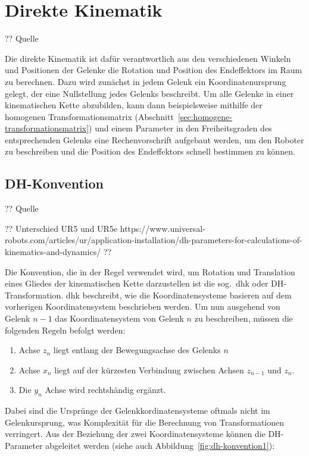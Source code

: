 \cleardoublepage


\chapter{Direkte Kinematik}\label{ch:direkte-kinematik}

?? Quelle

Die direkte Kinematik ist dafür verantwortlich aus den verschiedenen Winkeln und Positionen der Gelenke die Rotation und Position des Endeffektors im Raum zu berechnen.
Dazu wird zunächst in jedem Gelenk ein Koordinatenursprung gelegt, der eine Nullstellung jedes Gelenks beschreibt.
Um alle Gelenke in einer kinematischen Kette abzubilden, kann dann beispielsweise mithilfe der homogenen Transformationsmatrix (Abschnitt~\ref{sec:homogene-transformationsmatrix}) und einem Parameter in den Freiheitsgraden des entsprechenden Gelenks eine Rechenvorschrift aufgebaut werden, um den Roboter zu beschreiben und die Position des Endeffektors schnell bestimmen zu können.


\section{DH-Konvention}\label{sec:dh-konvention}

?? Quelle

?? Unterschied UR5 und UR5e https://www.universal-robots.com/articles/ur/application-installation/dh-parameters-for-calculations-of-kinematics-and-dynamics/ ??

Die Konvention, die in der Regel verwendet wird, um Rotation und Translation eines Gliedes der kinematischen Kette darzustellen ist die sog.\ \ac{dhk} oder DH-Transformation.
\ac{dhk} beschreibt, wie die Koordinatensysteme basieren auf dem vorherigen Koordinatensystem beschrieben werden.
Um nun ausgehend von Gelenk $n-1$ das Koordinatensystem von Gelenk $n$ zu beschreiben, müssen die folgenden Regeln befolgt werden:

\begin{enumerate}
    \item Achse $z_{n}$ liegt entlang der Bewegungsachse des Gelenks $n$
    \item Achse $x_{n}$ liegt auf der kürzesten Verbindung zwischen Achsen $z_{n-1}$ und $z_{n}$.
    \item Die $y_{n}$ Achse wird rechtshändig ergänzt.
\end{enumerate}

Dabei sind die Ursprünge der Gelenkkordinatensysteme oftmals nicht im Gelenkursprung, was Komplexität für die Berechnung von Transformationen verringert.
Aus der Beziehung der zwei Koordinatensysteme können die DH-Parameter abgeleitet werden (siehe auch Abbildung~\ref{fig:dh-konvention1}):

